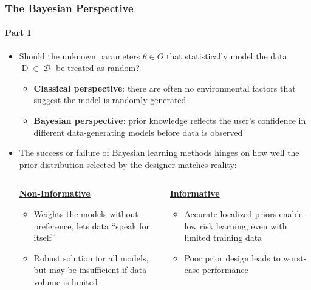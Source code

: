 \documentclass[aspectratio=169,usenames,dvipsnames]{beamer}
\DeclareMathOperator{\Drm}{\mathrm{D}}
\DeclareMathOperator{\Dcal}{\mathcal{D}}
\begin{document}
\begin{frame}
\frametitle{The Bayesian Perspective}
\framesubtitle{Part I}

\begin{itemize}
\item Should the unknown parameters $\theta \in \Theta$ that statistically model the data $\Drm \in \Dcal$ be treated as random?
	\vspace{0.25em}
	\begin{itemize}
	\item \textbf{Classical perspective}: there are often no environmental factors that suggest the model is randomly generated
	\vspace{0.25em}
	\item \textbf{Bayesian perspective}: prior knowledge reflects the user's confidence in different data-generating models before data is observed \cite{box}
	\end{itemize}
\vspace{0.5em}
\item The success or failure of Bayesian learning methods hinges on how well the \alert{prior distribution} selected by the designer matches reality:

\vspace{1em}
\begin{columns}[T]


\begin{column}{.5\textwidth}

\centering
\large \textbf{\underline{Non-Informative}} \normalsize
\vspace{0.2em}
\begin{itemize}
\item Weights the models without preference, lets data ``speak for itself''
\item Robust solution for all models, but may be insufficient if data volume is limited
\end{itemize}

\end{column}

\vrule

\begin{column}{.5\textwidth}

\centering
\large \textbf{\underline{Informative}} \normalsize
\vspace{0.2em}
\begin{itemize}
\item Accurate localized priors enable low risk learning, even with limited training data
\item Poor prior design leads to worst-case performance
\end{itemize}


\end{column}

\end{columns}

\end{itemize}

\end{frame}
\end{document}
